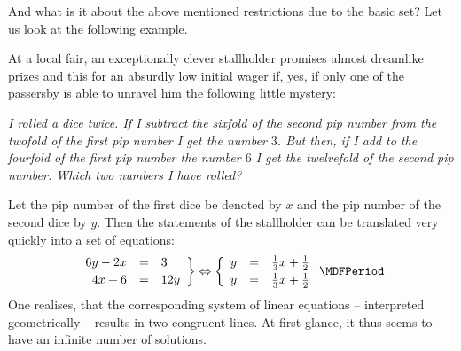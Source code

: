 \begin{MIntro}
And what is it about the above mentioned restrictions due to the basic set? 
Let us look at the following example.

\begin{MExample}
At a local fair, an exceptionally clever stallholder promises almost dreamlike prizes and this 
for an absurdly low initial wager if, yes, if only one of the passersby is able to unravel him the 
following little mystery:

\textit{I rolled a dice twice. If I subtract the sixfold of the second pip number from the twofold
of the first pip number I get the number $3$. But then, if I add to the fourfold of the first
pip number the number $6$ I get the twelvefold of the second pip number. Which two numbers I have rolled?}

Let the pip number of the first dice be denoted by $x$ and the pip number of the second dice by $y$. 
Then the statements of the stallholder can be translated very quickly into a set of equations:
$$\left. \begin{array}{rcl} 6 y - 2 x & = & 3 \\[.5ex] 4 x + 6 & = & 12 y \end{array} \right\} \Leftrightarrow
\left\{ \begin{array}{rcl} y & = & \Mtfrac13 x + \Mtfrac12 \\[.5ex]
y & = & \Mtfrac13 x + \Mtfrac12 \end{array} \right. \MDFPeriod $$
One realises, that the corresponding system of linear equations -- interpreted geometrically -- 
results in two congruent lines. At first glance, it thus seems to have an infinite number
of solutions.


\end{MExample}
\end{MIntro}
